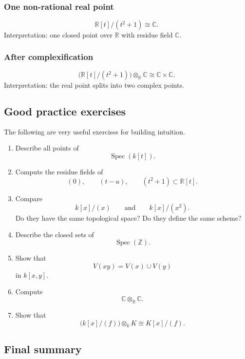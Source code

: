 \documentclass[12pt,a4paper]{article}
\theoremstyle{notespace}
\newcommand{\Spec}{\operatorname{Spec}}
\theoremstyle{definition}
\begin{document}
\subsubsection{One non-rational real point}
\[
\mathbb R[t]/(t^2+1)\cong \mathbb C.
\]
Interpretation: one closed point over \(\mathbb R\) with residue field \(\mathbb C\).

\subsubsection{After complexification}
\[
\bigl(\mathbb R[t]/(t^2+1)\bigr)\otimes_{\mathbb R}\mathbb C
\cong
\mathbb C\times \mathbb C.
\]
Interpretation: the real point splits into two complex points.

\subsection{Good practice exercises}

The following are very useful exercises for building intuition.

\begin{enumerate}[leftmargin=2em]
	\item Describe all points of
	\[
	\Spec(k[t]).
	\]
	
	\item Compute the residue fields of
	\[
	(0),\qquad (t-a),\qquad (t^2+1)\subset \mathbb R[t].
	\]
	
	\item Compare
	\[
	k[x]/(x)
	\qquad\text{and}\qquad
	k[x]/(x^2).
	\]
	Do they have the same topological space? Do they define the same scheme?
	
	\item Describe the closed sets of
	\[
	\Spec(\mathbb Z).
	\]
	
	\item Show that
	\[
	V(xy)=V(x)\cup V(y)
	\]
	in \(k[x,y]\).
	
	\item Compute
	\[
	\mathbb C\otimes_{\mathbb R}\mathbb C.
	\]
	
	\item Show that
	\[
	\bigl(k[x]/(f)\bigr)\otimes_k K \cong K[x]/(f).
	\]
\end{enumerate}

\subsection{Final summary}
\end{document}
